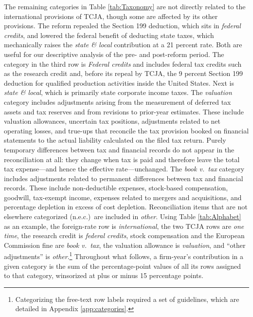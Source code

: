 \documentclass[11pt,letterpaper]{article}
\begin{document}
The remaining categories in Table \ref{tab:Taxonomy} are not directly
related to the international provisions of TCJA, though some are
affected by its other provisions. The reform repealed the Section 199
deduction, which sits in \emph{federal credits}, and lowered the
federal benefit of deducting state taxes, which mechanically raises the
\emph{state \& local} contribution at a 21 percent rate. Both are
useful for our descriptive analysis of the pre- and post-reform
period.
The category in the third row is \emph{Federal credits} and includes
federal tax credits such as the research credit and, before its repeal
by TCJA, the 9 percent Section 199 deduction for qualified production
activities inside the United States. Next is \emph{state \& local}, which is primarily
state corporate income taxes.
The \emph{valuation} category includes adjustments arising from the
measurement of deferred tax assets and tax reserves and from revisions
to prior-year estimates. These include valuation allowances, uncertain
tax positions, adjustments related to net operating losses, and
true-ups that reconcile the tax provision booked on financial
statements to the actual liability calculated on the filed tax return.
Purely temporary differences between tax and financial records do not
appear in the reconciliation at all: they change when tax is paid
and therefore leave the total tax expense---and hence the
effective rate---unchanged.
The \emph{book v.~tax} category includes adjustments related to
permanent differences between tax and financial records. 
These include non-deductible expenses, stock-based compensation,
goodwill, tax-exempt income, expenses related to mergers and
acquisitions, and percentage depletion in excess of cost depletion. 
Reconciliation items that are not elsewhere categorized (n.e.c.)~are 
included in \emph{other}. Using Table \ref{tab:Alphabet} as an example, the
foreign-rate row is \emph{international}, the two TCJA rows are
\emph{one time}, the research credit is \emph{federal credits}, stock
compensation and the European Commission fine are \emph{book v.~tax},
the valuation allowance is \emph{valuation}, and ``other adjustments''
is \emph{other}.\footnote{%
Categorizing the free-text row labels required a set of guidelines, 
which are detailed in Appendix \ref{app:categories}.}
Throughout what follows, a firm-year's contribution in a given category
is the sum of the percentage-point values of all its rows assigned to
that category, winsorized at plus or minus 15 percentage points.


% 
%
\end{document}
